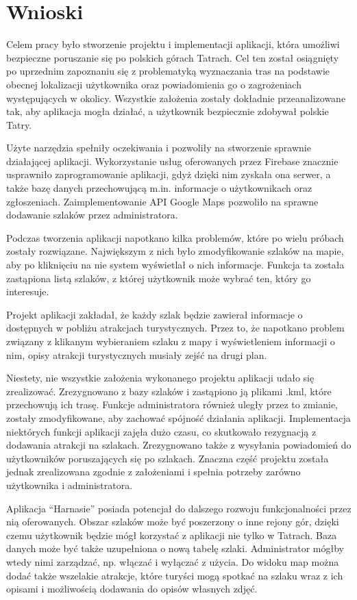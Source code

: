 \section{Wnioski} \label{wnioski}
Celem pracy było stworzenie projektu i implementacji aplikacji, która umożliwi bezpieczne poruszanie się po polskich górach Tatrach. Cel ten został osiągnięty po uprzednim zapoznaniu się z problematyką wyznaczania tras na podstawie obecnej lokalizacji użytkownika oraz powiadomienia go o zagrożeniach występujących w okolicy. Wszystkie założenia zostały dokładnie przeanalizowane tak, aby aplikacja mogła działać, a użytkownik bezpiecznie zdobywał polskie Tatry.

Użyte narzędzia spełniły oczekiwania i pozwoliły na stworzenie sprawnie działającej aplikacji. Wykorzystanie usług oferowanych przez Firebase znacznie usprawniło zaprogramowanie aplikacji, gdyż dzięki nim zyskała ona serwer, a także bazę danych przechowującą m.in. informacje o użytkownikach oraz zgłoszeniach. Zaimplementowanie API Google Maps pozwoliło na sprawne dodawanie szlaków przez administratora.

Podczas tworzenia aplikacji napotkano kilka problemów, które po wielu próbach zostały rozwiązane. Największym z nich było zmodyfikowanie szlaków na mapie, aby po kliknięciu na nie system wyświetlał o nich informacje. Funkcja ta została zastąpiona listą szlaków, z której użytkownik może wybrać ten, który go interesuje.

Projekt aplikacji zakładał, że każdy szlak będzie zawierał informacje o dostępnych w pobliżu atrakcjach turystycznych. Przez to, że napotkano problem związany z klikanym wybieraniem szlaku z mapy i wyświetleniem informacji o nim, opisy atrakcji turystycznych musiały zejść na drugi plan.

Niestety, nie wszystkie założenia wykonanego projektu aplikacji udało się zrealizować. Zrezygnowano z bazy szlaków i zastąpiono ją plikami .kml, które przechowują ich trasę. Funkcje administratora również uległy przez to zmianie, zostały zmodyfikowane, aby zachować spójność działania aplikacji. Implementacja niektórych funkcji aplikacji zajęła dużo czasu, co skutkowało rezygnacją z dodawania atrakcji na szlakach. Zrezygnowano także z wysyłania powiadomień do użytkowników poruszających się po szlakach. Znaczna część projektu została jednak zrealizowana zgodnie z założeniami i spełnia potrzeby zarówno użytkownika i administratora.

Aplikacja “Harnasie” posiada potencjał do dalszego rozwoju funkcjonalności przez nią oferowanych. Obszar szlaków może być poszerzony o inne rejony gór, dzięki czemu użytkownik będzie mógł korzystać z aplikacji nie tylko w Tatrach. Baza danych może być także uzupełniona o nową tabelę szlaki. Administrator mógłby wtedy nimi zarządzać, np. włączać i wyłączać z użycia. Do widoku map można dodać także wszelakie atrakcje, które turyści mogą spotkać na szlaku wraz z ich opisami i możliwością dodawania do opisów własnych zdjęć.

